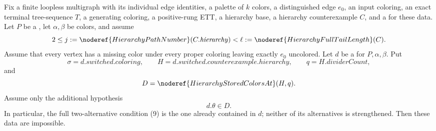 \begin{lemma}
Fix a finite loopless multigraph with its individual edge identities, a
palette of $k$ colors, a distinguished edge $e_0$, an input coloring,
an exact terminal tree-sequence $T$, a generating coloring, a
positive-rung ETT, a hierarchy base, a hierarchy counterexample $C$, and
a  for these data.  Let
$P$ be a , let
$\alpha,\beta$ be colors, and assume
\[
 2\le j:=\noderef{HierarchyPathNumber}(C.\mathit{hierarchy})
   <\ell:=\noderef{HierarchyFullTailLength}(C).
\]
Assume that every vertex has a missing color under every proper coloring
leaving exactly $e_0$ uncolored.  Let $d$ be a
 for
$P,\alpha,\beta$.  Put
\[
 \sigma=d.\mathit{switched.coloring},\qquad
 H=d.\mathit{switched.counterexample.hierarchy},\qquad
 q=H.\mathit{dividerCount},
\]
and
\[
 D=\noderef{HierarchyStoredColorsAt}(H,q).
\]
Assume only the additional hypothesis
\[
                         d.\theta\in D.                       \tag{S}
\]
In particular, the full two-alternative condition (9) is the one already
contained in $d$; neither of its alternatives is strengthened.  Then
these data are impossible.
\end{lemma}
